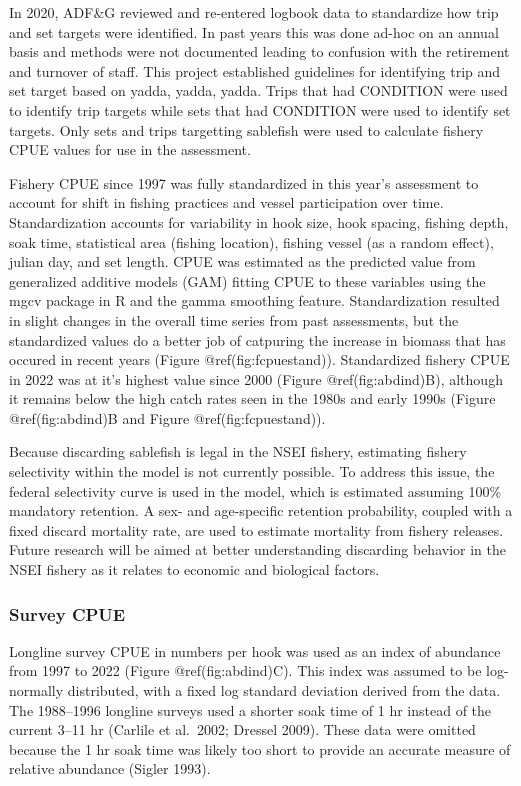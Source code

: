 \documentclass[
]{article}
\begin{document}
{In 2020, ADF\&G reviewed and re-entered logbook data to standardize how
trip and set targets were identified. In past years this was done ad-hoc
on an annual basis and methods were not documented leading to confusion
with the retirement and turnover of staff. This project established
guidelines for identifying trip and set target based on yadda, yadda,
yadda. Trips that had CONDITION were used to identify trip targets while
sets that had CONDITION were used to identify set targets. Only sets and
trips targetting sablefish were used to calculate fishery CPUE values
for use in the assessment. }

Fishery CPUE since 1997 was fully standardized in this year's assessment
to account for shift in fishing practices and vessel participation over
time. Standardization accounts for variability in hook size, hook
spacing, fishing depth, soak time, statistical area (fishing location),
fishing vessel (as a random effect), julian day, and set length. CPUE
was estimated as the predicted value from generalized additive models
(GAM) fitting CPUE to these variables using the mgcv package in R and
the gamma smoothing feature. Standardization resulted in slight changes
in the overall time series from past assessments, but the standardized
values do a better job of catpuring the increase in biomass that has
occured in recent years (Figure @ref(fig:fcpuestand)). Standardized
fishery CPUE in 2022 was at it's highest value since 2000 (Figure
@ref(fig:abdind)B), although it remains below the high catch rates seen
in the 1980s and early 1990s (Figure @ref(fig:abdind)B and Figure
@ref(fig:fcpuestand)).

Because discarding sablefish is legal in the NSEI fishery, estimating
fishery selectivity within the model is not currently possible. To
address this issue, the federal selectivity curve is used in the model,
which is estimated assuming 100\% mandatory retention. A sex- and
age-specific retention probability, coupled with a fixed discard
mortality rate, are used to estimate mortality from fishery releases.
Future research will be aimed at better understanding discarding
behavior in the NSEI fishery as it relates to economic and biological
factors.

\hypertarget{survey-cpue}{%
\subsubsection{Survey CPUE}\label{survey-cpue}}

Longline survey CPUE in numbers per hook was used as an index of
abundance from 1997 to 2022 (Figure @ref(fig:abdind)C). This index was
assumed to be log-normally distributed, with a fixed log standard
deviation derived from the data. The 1988--1996 longline surveys used a
shorter soak time of 1 hr instead of the current 3--11 hr (Carlile et
al.~2002; Dressel 2009). These data were omitted because the 1 hr soak
time was likely too short to provide an accurate measure of relative
abundance (Sigler 1993).
\end{document}

